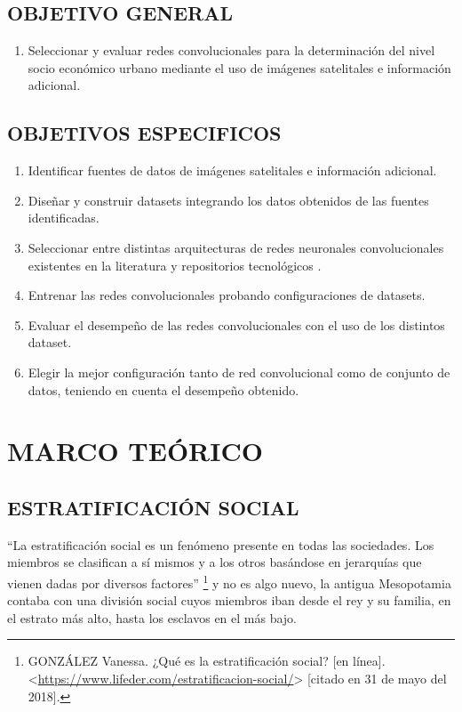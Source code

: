 	\section{OBJETIVO GENERAL}
		\begin{enumerate}
		\item Seleccionar y evaluar redes convolucionales para la determinación del nivel socio económico urbano mediante el uso de imágenes satelitales e información adicional.
		\end{enumerate}

	\section{OBJETIVOS ESPECIFICOS}
	    \begin{enumerate}
	      \item Identificar fuentes de datos de imágenes satelitales e información adicional.
	      \item Diseñar y construir datasets integrando los datos obtenidos de las fuentes identificadas.
	      \item Seleccionar entre distintas arquitecturas de redes neuronales convolucionales existentes en la literatura y repositorios tecnológicos    .
	      \item Entrenar las redes convolucionales probando configuraciones de datasets.
	      \item Evaluar el desempeño de las redes convolucionales con el uso de los distintos dataset. 
	      \item Elegir la mejor configuración tanto de red convolucional como de conjunto de datos, teniendo en cuenta el desempeño obtenido.   
	    \end{enumerate}


\newpage\chapter{MARCO TEÓRICO}    
     
    
	\section{ESTRATIFICACIÓN SOCIAL}
    
    “La estratificación social es un fenómeno presente en todas las sociedades. Los miembros se clasifican a sí mismos y a los otros basándose en jerarquías que vienen dadas por diversos factores”
    \footnote[8]{GONZÁLEZ Vanessa. ¿Qué es la estratificación social? [en línea]. <\url{https://www.lifeder.com/estratificacion-social/}> [citado en 31 de mayo del 2018].} y no es algo nuevo, la antigua Mesopotamia contaba con una división social cuyos miembros iban desde el rey y su familia, en el estrato más alto, hasta los esclavos en el más bajo.
    
